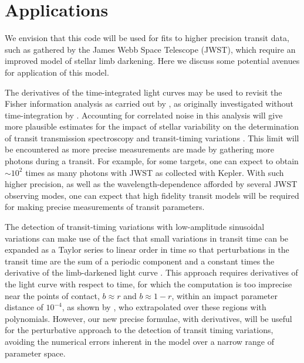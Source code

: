 \documentclass[modern]{aastex61}
\begin{document}

\section{Applications}

We envision that this code will be used for fits to higher precision
transit data, such as gathered by the James Webb Space Telescope (JWST), 
which require an improved model of stellar limb darkening.  Here we discuss 
some potential avenues for application of this model.

The derivatives of the time-integrated light curves may be used to revisit the
Fisher information analysis as carried out by \citet{Price2014}, as originally
investigated without time-integration by \citet{Carter2008}.  Accounting
for correlated noise in this analysis will give more plausible estimates
for the impact of stellar variability on the determination of transit
transmission spectroscopy and transit-timing variations \citep{ForemanMackey2017}.  
This limit will be encountered as more precise measurements are made by gathering 
more photons during a transit.  For example, for some targets, one can expect to 
obtain $\sim 10^2$ times as many photons with JWST as collected with Kepler.
With such higher precision, as well as the wavelength-dependence afforded
by several JWST observing modes, one can expect that high fidelity transit
models will be required for making precise measurements of transit parameters.

The detection of transit-timing variations with low-amplitude sinusoidal
variations can make use of the fact that small variations in transit time
can be expanded as a Taylor series to linear order in time so that perturbations
in the transit time are the sum of a periodic component and a constant
times the derivative of the limb-darkened light curve \citep{Ofir2018}.
This approach requires derivatives of the light curve with respect to
time, for which the \citet{MandelAgol2002} computation is too
imprecise near the points of contact, $b \approx r$ and $b \approx 1-r$,
within an impact parameter distance of $10^{-4}$, as shown by \citet{Ofir2018},
who extrapolated over these regions with polynomials.
However, our new precise formulae, with derivatives, will be useful
for the perturbative approach to the detection of transit timing
variations, avoiding the numerical errors inherent in the \citet{MandelAgol2002}
model over a narrow range of parameter space.
\end{document}
